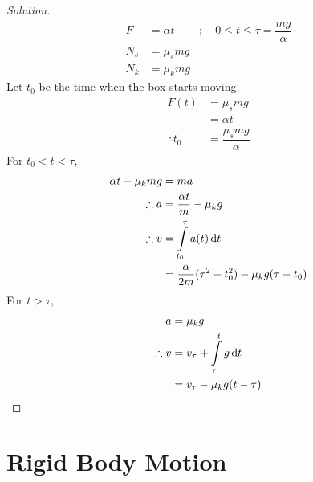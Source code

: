 \documentclass[fleqn, a5paper]{amsart}
\theoremstyle{definition}
\theoremstyle{theorem}
\newenvironment{solution}
{\begin{proof}[Solution]\let\qed\relax}
	{\end{proof}}
\begin{document}
\begin{solution}
	\begin{align*}
		F &= \alpha t &;\quad 0 \leq t \leq \tau = \dfrac{mg}{\alpha}\\
		N_s &= \mu_s m g\\
		N_k &= \mu_k m g
	\end{align*}
		Let $t_0$ be the time when the box starts moving.
	\begin{align*}
		F(t) &= \mu_s m g\\
		&= \alpha t\\
		\therefore t_0 &= \dfrac{\mu_s m g}{\alpha}
	\end{align*}
		For $t_0 < t < \tau$,
	\begin{align*}
		\alpha t - \mu_k m g &= m a\\
		\therefore a &= \dfrac{\alpha t}{m} - \mu_k g\\
		\therefore v &= \int\limits_{t_0}^{\tau} a(t) \dif t\\
		&= \dfrac{\alpha}{2m} (\tau^2 - t_0^2) - \mu_k g (\tau - t_0)
	\end{align*}
		For $t > \tau$,
	\begin{align*}
		a &= \mu_k g\\
		\therefore v &= v_{\tau} + \int\limits_{\tau}^{t} g \dif t\\
		&= v_{\tau} - \mu_k g (t - \tau)
	\end{align*}
\end{solution}

\section{Rigid Body Motion}
\end{document}
